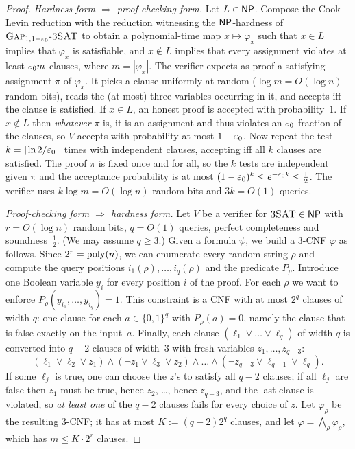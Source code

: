 \begin{proof}
\emph{Hardness form $\Rightarrow$ proof-checking form.}  Let $L\in\mathsf{NP}$.  Compose the Cook--Levin
reduction with the reduction witnessing the $\mathsf{NP}$-hardness of $\textsc{Gap}_{1,1-\varepsilon_0}\text{-}\textsc{3SAT}$ to obtain a
polynomial-time map $x\mapsto\varphi_x$ such that $x\in L$ implies that $\varphi_x$ is
satisfiable, and $x\notin L$ implies that every assignment violates at least $\varepsilon_0 m$ clauses,
where $m=|\varphi_x|$.  The verifier expects as proof a satisfying assignment $\pi$ of $\varphi_x$.
It picks a clause uniformly at random ($\log m=O(\log n)$ random bits), reads the (at most) three
variables occurring in it, and accepts iff the clause is satisfied.  If $x\in L$, an honest
proof is accepted with probability~$1$.  If $x\notin L$ then \emph{whatever} $\pi$ is, it is an
assignment and thus violates an $\varepsilon_0$-fraction of the clauses, so $V$ accepts with probability
at most $1-\varepsilon_0$.  Now repeat the test $k=\lceil\ln2/\varepsilon_0\rceil$ times with
independent clauses, accepting iff all $k$ clauses are satisfied.  The proof $\pi$ is fixed once
and for all, so the $k$ tests are independent given $\pi$ and the acceptance probability is at most
$(1-\varepsilon_0)^k\le e^{-\varepsilon_0k}\le\tfrac12$.  The verifier uses $k\log m=O(\log n)$ random bits and
$3k=O(1)$ queries.

\emph{Proof-checking form $\Rightarrow$ hardness form.}  Let $V$ be a verifier for $\textsc{3SAT}\in\mathsf{NP}$
with $r=O(\log n)$ random bits, $q=O(1)$ queries, perfect completeness and soundness~$\tfrac12$.
(We may assume $q\ge3$.)  Given a formula $\psi$, we build a $3$-CNF $\varphi$ as follows.
Since $2^r=\operatorname{poly}(n)$, we can enumerate every random string $\rho$ and compute the query positions
$i_1(\rho),\dots,i_q(\rho)$ and the predicate $P_\rho$.  Introduce one Boolean variable $y_i$ for every
position $i$ of the proof.  For each $\rho$ we want to enforce $P_\rho(y_{i_1},\dots,y_{i_q})=1$.  This
constraint is a CNF with at most $2^q$ clauses of width $q$: one clause for each $a\in\{0,1\}^q$ with
$P_\rho(a)=0$, namely the clause that is false exactly on the input~$a$.  Finally, each clause
$(\ell_1\vee\dots\vee\ell_q)$ of width $q$ is converted into $q-2$ clauses of width~$3$ with fresh
variables $z_1,\dots,z_{q-3}$:
\[
  (\ell_1\vee\ell_2\vee z_1)\wedge(\neg z_1\vee\ell_3\vee z_2)\wedge\dots\wedge(\neg z_{q-3}\vee\ell_{q-1}\vee\ell_q).
\]
If some $\ell_j$ is true, one can choose the $z$'s to satisfy all $q-2$ clauses; if all $\ell_j$ are
false then $z_1$ must be true, hence $z_2$, \dots, hence $z_{q-3}$, and the last clause is violated, so
\emph{at least one} of the $q-2$ clauses fails for every choice of $z$.
Let $\varphi_\rho$ be the resulting $3$-CNF; it has at most $K:=(q-2)2^q$ clauses, and let $\varphi=\bigwedge_\rho\varphi_\rho$,
which has $m\le K\cdot 2^r$ clauses.


\end{proof}
